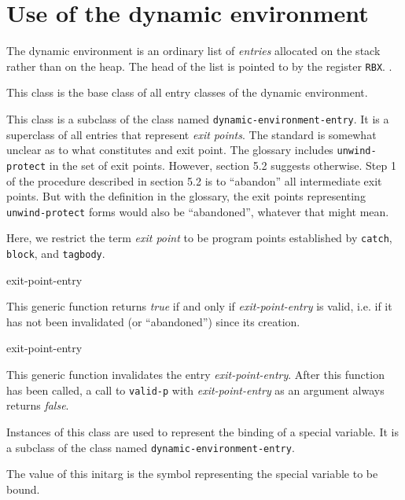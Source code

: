 \section{Use of the dynamic environment}

The dynamic environment is an ordinary list of \emph{entries}
allocated on the stack rather than on the heap.  The head of the list
is pointed to by the register \texttt{RBX}.
.


This class is the base class of all entry classes of the dynamic
environment.


This class is a subclass of the class named
\texttt{dynamic-environment-entry}.  It is a superclass of all entries
that represent \emph{exit points}.  The \commonlisp{} standard is
somewhat unclear as to what constitutes and exit point.  The glossary
includes \texttt{unwind-protect} in the set of exit points.  However,
section 5.2 suggests otherwise.  Step 1 of the procedure described in
section 5.2 is to ``abandon'' all intermediate exit points.  But with
the definition in the glossary, the exit points representing
\texttt{unwind-protect} forms would also be ``abandoned'', whatever
that might mean.

Here, we restrict the term \emph{exit point} to be program points
established by \texttt{catch}, \texttt{block}, and \texttt{tagbody}.

 {exit-point-entry}

This generic function returns \textit{true} if and only if
\textit{exit-point-entry} is valid, i.e. if it has not been invalidated (or
``abandoned'') since its creation.

 {exit-point-entry}

This generic function invalidates the entry \textit{exit-point-entry}.
After this function has been called, a call to \texttt{valid-p} with
\textit{exit-point-entry} as an argument always returns \textit{false}.


Instances of this class are used to represent the binding of a special
variable.  It is a subclass of the class named
\texttt{dynamic-environment-entry}.


The value of this initarg is the symbol representing the special
variable to be bound.

